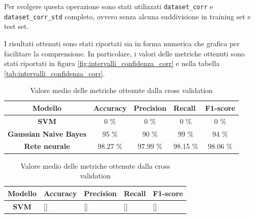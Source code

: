 Per svolgere questa operazione sono stati utilizzati \texttt{dataset\_corr} e 
\texttt{dataset\_corr\_std} completo, ovvero senza alcuna suddivisione in training 
set e test set.

I risultati ottenuti sono stati riportati sia in forma numerica che grafica
per facilitare la comprensione. In particolare, i valori delle metriche ottenuti
sono stati riportati in figura \ref{fig:intervalli_confidenza_corr} e
nella tabella \ref{tab:intervalli_confidenza_corr}.

\begin{table}[!ht]
    \begin{subtable}[h]{1\textwidth}
        \centering
        \begin{tabular}{@{}cllll@{}}
            \toprule
            \rowcolor[HTML]{EFEFEF}
            \textbf{Modello}                                      & \textbf{Accuracy}         & \textbf{Precision}          & \textbf{Recall}            & \textbf{F1-score}            \\ \midrule
            \cellcolor[HTML]{EFEFEF}\textbf{SVM}                  & \multicolumn{1}{c}{0 \%}     & \multicolumn{1}{c}{0 \%}     & \multicolumn{1}{c}{0 \%}     & \multicolumn{1}{c}{0 \%}     \\
            \cellcolor[HTML]{EFEFEF}\textbf{Gaussian Naive Bayes} & \multicolumn{1}{c}{95 \%}    & \multicolumn{1}{c}{90 \%}    & \multicolumn{1}{c}{99 \%}    & \multicolumn{1}{c}{94 \%}    \\
            \cellcolor[HTML]{EFEFEF}\textbf{Rete neurale}         & \multicolumn{1}{c}{98.27 \%} & \multicolumn{1}{c}{97.99 \%} & \multicolumn{1}{c}{98.15 \%} & \multicolumn{1}{c}{98.06 \%} \\ \bottomrule
        \end{tabular}
        \caption{Valore medio delle metriche ottenute dalla cross validation}
        \label{tab:risultati_cross_val_corr}
    \end{subtable}
    \hfill
    \begin{subtable}[h]{1\textwidth}
        \centering
        \begin{tabular}{@{}cllll@{}}
            \toprule
            \rowcolor[HTML]{EFEFEF}
            \textbf{Modello}                                      & \textbf{Accuracy} & \textbf{Precision} & \textbf{Recall}  & \textbf{F1-score}  \\ \midrule
            \cellcolor[HTML]{EFEFEF}\textbf{SVM}                  & []                   & []                  & []                 & []                 \\

\end{tabular}
\end{subtable}
\end{table}
